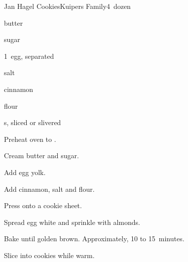 \begin{recipe}{Jan Hagel Cookies}{Kuipers Family}{4~dozen}

\begin{ingredients}
\item {} butter
\item {} sugar
\item 1~egg, separated
\item \tp{\half} salt
\item \tp{\half} cinnamon
\item {} flour
\item {}s, sliced or slivered
\end{ingredients}

\begin{directions}
\item Preheat oven to .
\item Cream butter and sugar.
\item Add egg yolk.
\item Add cinnamon, salt and flour.
\item Press onto a cookie sheet.
\item Spread egg white and sprinkle with almonds.
\item Bake until golden brown. Approximately, 10 to 15~minutes.
\item Slice into cookies while warm.
\end{directions}
\end{recipe}
